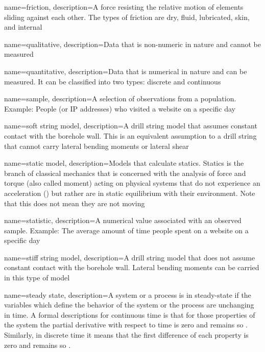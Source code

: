 {
	name=friction,
	description={A force resisting the relative motion of elements sliding against each other.  The types of friction are dry, fluid, lubricated, skin, and internal}
}

{
	name=qualitative,
	description={Data that is non-numeric in nature and cannot be measured}
}

{
	name=quantitative,
	description={Data that is numerical in nature and can be measured.  It can be classified into two types: discrete and continuous}
}

{
	name=sample,
	description={A selection of observations from a population.  Example: People (or IP addresses) who visited a website on a specific day}
}

{
	name=soft string model,
	description={A drill string model that assumes constant contact with the borehole wall.  This is an equivalent assumption to a drill string that cannot carry lateral bending moments or lateral shear}
}

{
	name=static model,
	description=Models that calculate statics.  Statics is the branch of classical mechanics that is concerned with the analysis of force and torque (also called moment) acting on physical systems that do not experience an acceleration (\staticforcebalance)\comma{} but rather\comma{} are in static equilibrium with their environment.  Note that this does not mean they are not moving
}

{
	name=statistic,
	description={A numerical value associated with an observed sample.  Example: The average amount of time people spent on a website on a specific day}
}

{
	name=stiff string model,
	description={A drill string model that does not assume constant contact with the borehole wall.  Lateral bending moments can be carried in this type of model}
}

{
	name=steady state,
	description=A system or a process is in steady-state if the variables which define the behavior of the system or the process are unchanging in time.  A formal descriptions for continuous time\comma{} is that for those properties \systemproperty{} of the system\comma{} the partial derivative with respect to time is zero and remains so \continuoussteadystate{}.  Similarly, in discrete time\comma{} it means that the first difference of each property is zero and remains so \discretesteadystate{}.
}

